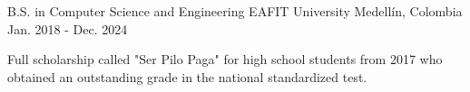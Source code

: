 

\begin{cventries}

  \cventry
    {B.S. in Computer Science and Engineering} %
    {EAFIT University} %
    {Medellín, Colombia} %
    {Jan. 2018 - Dec. 2024} %
    {
      \begin{cvitems} %
        \item {Full scholarship called "Ser Pilo Paga" for high school students from 2017 who
        obtained an outstanding grade in the national standardized test.}
      \end{cvitems}
    }

\end{cventries}
